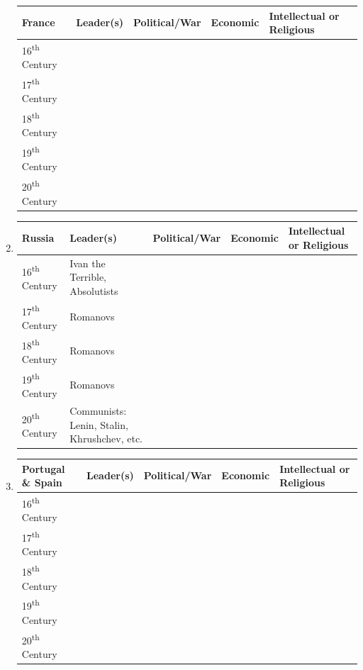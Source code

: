 \documentclass[12pt]{article}
\begin{document}
\begin{enumerate}
\begin{tabular}{p{} p{} p{} p{} p{}}
France & Leader(s) & Political/War & Economic & Intellectual or Religious \\
\hline
16\textsuperscript{th} Century & & & & \\
\hline
17\textsuperscript{th} Century & & & & \\
\hline
18\textsuperscript{th} Century & & & & \\
\hline
19\textsuperscript{th} Century & & & & \\
\hline
20\textsuperscript{th} Century & & & & \\

\end{tabular}

\item \begin{tabular}{p{} p{} p{} p{} p{}}

Russia & Leader(s) & Political/War & Economic & Intellectual or Religious \\
\hline
16\textsuperscript{th} Century & Ivan the Terrible, Absolutists & & & \\
\hline
17\textsuperscript{th} Century & Romanovs & & & \\
\hline
18\textsuperscript{th} Century & Romanovs  & & & \\
\hline
19\textsuperscript{th} Century & Romanovs & & & \\
\hline
20\textsuperscript{th} Century & Communists: Lenin, Stalin, Khrushchev, etc. & & & \\

\end{tabular}

\item \begin{tabular}{p{} p{} p{} p{} p{}}

Portugal \& Spain & Leader(s) & Political/War & Economic & Intellectual or Religious \\
\hline
16\textsuperscript{th} Century & & & & \\
\hline
17\textsuperscript{th} Century & & & & \\
\hline
18\textsuperscript{th} Century & & & & \\
\hline
19\textsuperscript{th} Century & & & & \\
\hline
20\textsuperscript{th} Century & & & & \\

\end{tabular}


\end{enumerate}
\end{document}
